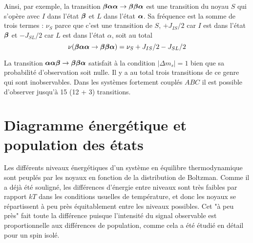 Ainsi, par exemple, la transition $\boldsymbol{\beta}\boldsymbol{\alpha}\boldsymbol{\alpha} \rightarrow \boldsymbol{\beta}\boldsymbol{\beta}\boldsymbol{\alpha}$ est une transition
du noyau $S$ qui s'opère avec $I$ dans l'état $\boldsymbol{\beta}$ et $L$ dans l'état $\boldsymbol{\alpha}$.
Sa fréquence est la somme de trois termes : $\nu_S$ parce que c'est une transition
de $S$, $+J_{IS}/2$ car $I$ est dans l'état $\boldsymbol{\beta}$ et $-J_{SL}/2$ car $L$ est dans
l'état $\alpha$, soit au total 
\begin{equation}
\nu(\boldsymbol{\beta}\boldsymbol{\alpha}\boldsymbol{\alpha} \rightarrow \boldsymbol{\beta}\boldsymbol{\beta}\boldsymbol{\alpha}) = \nu_S + J_{IS}/2 - J_{SL}/2
\end{equation}

La transition $\boldsymbol{\alpha}\boldsymbol{\alpha}\boldsymbol{\beta} \rightarrow \boldsymbol{\beta}\boldsymbol{\beta}\boldsymbol{\alpha}$ satisfait à la condition
$|\Delta m_s| = 1$ bien que sa probabilité d'observation soit nulle.
Il y a au total trois transitions de ce genre qui sont inobservables.
Dans les systèmes fortement couplés $ABC$ il est possible d'observer
jusqu'à 15 (12 + 3) transitions.

\section{Diagramme énergétique et population des états}

Les différents niveaux énergétiques d'un système en équilibre thermodynamique
sont peuplés par les noyaux en fonction de la distribution de Boltzman.
Comme il a déjà été souligné, les différences d'énergie entre niveaux sont
très faibles par rapport $kT$ dans les conditions usuelles de température,
et donc les noyaux se répartissent à peu près équitablement
entre les niveaux possibles. 
Cet "à peu près" fait toute la différence puisque
l'intensité du signal observable est proportionnelle aux différences de population,
comme cela a été étudié en détail pour un spin isolé.

